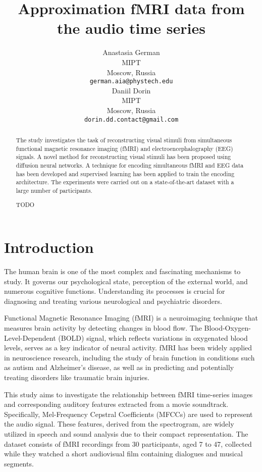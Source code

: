 \documentclass{article}
\title{Approximation fMRI data from the audio time series}
\author{%
  Anastasia German\\
  MIPT\\
  Moscow, Russia\\
  \texttt{german.aia@phystech.edu}\\
  \And
  Daniil Dorin\\
  MIPT\\
  Moscow, Russia\\
  \texttt{dorin.dd.contact@gmail.com}\\
}
\begin{document}
\maketitle

\begin{abstract}
    The study investigates the task of reconstructing visual stimuli from simultaneous functional magnetic resonance imaging (fMRI) and electroencephalography (EEG) signals. A novel method for reconstructing visual stimuli has been proposed using diffusion neural networks. A technique for encoding simultaneous fMRI and EEG data has been developed and supervised learning has been applied to train the encoding architecture. The experiments were carried out on a state-of-the-art dataset with a large number of participants.
    
    TODO
\end{abstract}

\section{Introduction}\label{sec:intro}

The human brain is one of the most complex and fascinating mechanisms to study. It governs our psychological state, perception of the external world, and numerous cognitive functions. Understanding its processes is crucial for diagnosing and treating various neurological and psychiatric disorders.

Functional Magnetic Resonance Imaging (fMRI)\cite{article1} is a neuroimaging technique that measures brain activity by detecting changes in blood flow. The Blood-Oxygen-Level-Dependent (BOLD) signal\cite{article2}, which reflects variations in oxygenated blood levels, serves as a key indicator of neural activity. fMRI has been widely applied in neuroscience research, including the study of brain function in conditions such as autism and Alzheimer's disease\cite{article3}, as well as in predicting and potentially treating disorders like traumatic brain injuries.

This study aims to investigate the relationship between fMRI time-series images and corresponding auditory features extracted from a movie soundtrack. Specifically, Mel-Frequency Cepstral Coefficients (MFCCs) \cite{article4} are used to represent the audio signal. These features, derived from the spectrogram, are widely utilized in speech and sound analysis due to their compact representation. The dataset \cite{article5} consists of fMRI recordings from 30 participants, aged 7 to 47, collected while they watched a short audiovisual film containing dialogues and musical segments.
\end{document}
